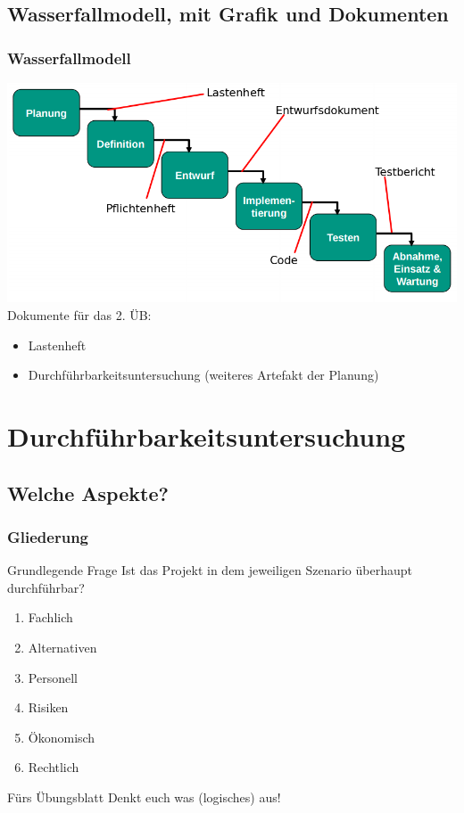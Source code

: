 \documentclass[18pt]{beamer}
\begin{document}
	\subsection{Wasserfallmodell, mit Grafik und Dokumenten}
	\begin{frame}
		\frametitle{Wasserfallmodell}
		\includegraphics[scale=0.4]{./pics/tut1/waterfall_with-docs.png}
		Dokumente für das 2. ÜB: 
		\begin{itemize}
			\item Lastenheft
			\item Durchführbarkeitsuntersuchung (weiteres Artefakt der Planung)
		\end{itemize}
	\end{frame}

\section{Durchführbarkeitsuntersuchung}
	\subsection{Welche Aspekte?}
	\begin{frame}
		\frametitle{Gliederung}
		\begin{block}{Grundlegende Frage}
			Ist das Projekt in dem jeweiligen Szenario überhaupt durchführbar?
		\end{block}
		\begin{enumerate}
			\item \pause Fachlich \pause 
			\item Alternativen \pause
			\item Personell \pause 
			\item Risiken \pause
			\item Ökonomisch \pause 
			\item Rechtlich 
		\end{enumerate}
		\pause
		\begin{alertblock}{Fürs Übungsblatt}
			Denkt euch was (logisches) aus!
		\end{alertblock}
	\end{frame}
\end{document}
